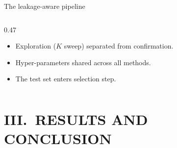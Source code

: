 \documentclass[aspectratio=169, 11pt]{beamer}
\begin{document}
\begin{frame}{The leakage-aware pipeline}
\begin{columns}[c]
\begin{column}{0.47\textwidth}
      \begin{itemize}\small
        \item Exploration ($K$ sweep) separated from confirmation.
        \item Hyper-parameters shared across all methods.
        \item The test set enters  selection step.
      \end{itemize}
    \end{column}
  \end{columns}
\end{frame}

\section{III.\ RESULTS AND CONCLUSION}
\end{document}
